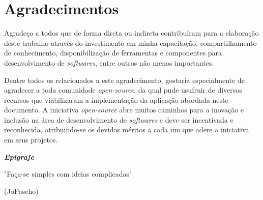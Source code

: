 \documentclass[brazil,ruledheader]{abntifes}
\begin{document}
	\chapter*{Agradecimentos}
	Agradeço a todos que de forma direta ou indireta contribuíram para a elaboração deste trabalho através do investimento em minha capacitação, compartilhamento de conhecimento, disponibilização de ferramentas e componentes para desenvolvimento de \textit{softwares}, entre outros não menos importantes.
	
	Dentre todos os relacionados a este agradecimento, gostaria especialmente de agradecer a toda comunidade \textit{open-source}, da qual pude usufruir de diversos recursos que viabilizaram a implementação da aplicação abordada neste documento. A iniciativa \textit{open-source} abre muitos caminhos para a inovação e inclusão na área de desenvolvimento de \textit{softwares} e deve ser incentivada e reconhecida, atribuindo-se os devidos méritos a cada um que adere a iniciativa em seus projetos.
	\vfill 
	\null
	
	\begin{center}
		{\Huge {\bfseries\itshape Epígrafe}}\\[3cm]
		\vspace{15cm}
	\end{center}
	
	\begin{espacoduplo}
	\end{espacoduplo}
	
	\epigraph{"Faça-se simples com ideias complicadas"}{(JoPaseho)}
	
\end{document}
